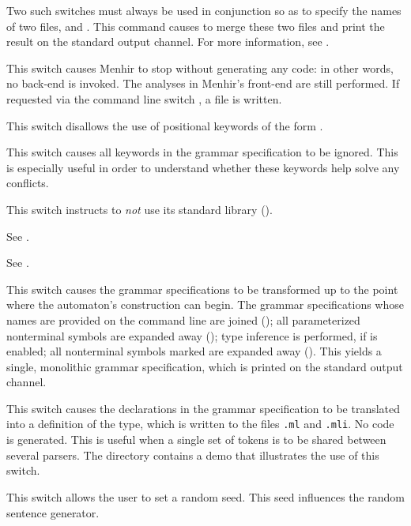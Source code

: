 \documentclass[onecolumn,11pt,nocopyrightspace,preprint]{sigplanconf}
\begin{document}
 Two such
switches must always be used in conjunction so as to specify the names of two
\messages files,  and . This command causes
\menhir to merge these two \messages files and print the result on the
standard output channel. For more information, see .

\docswitch{\onocodegeneration} This switch causes Menhir to stop without
generating any code: in other words, no back-end is invoked. The analyses in
Menhir's front-end are still performed. If requested via the command line
switch \ocmly, a \cmly file is written.

\docswitch{\onodollars} This switch disallows the use of positional keywords
of the form .

\docswitch{\onoinline} This switch causes all \dinline keywords in the
grammar specification to be ignored. This is especially useful in order
to understand whether these keywords help solve any conflicts.

\docswitch{\onostdlib} This switch instructs \menhir to \emph{not} use
its standard library ().

 See .

 See .

\docswitch{\oonlypreprocess} This switch causes the grammar specifications
to be transformed up to the point where the automaton's construction can
begin. The grammar specifications whose names are provided on the command line
are joined (); all parameterized nonterminal symbols are
expanded away (); type inference is performed, if \oinfer
is enabled; all nonterminal symbols marked \dinline are expanded away
(). This yields a single, monolithic grammar specification,
which is printed on the standard output channel.

\docswitch{\oonlytokens} This switch causes the \dtoken declarations in
the grammar specification to be translated into a definition of the \token
type, which is written to the files \texttt{.ml} and
\texttt{.mli}. No code is generated. This is useful when
a single set of tokens is to be shared between several parsers. The directory
 contains a demo that illustrates the use of this switch.

 This switch allows the user to set
a random seed. This seed influences the random sentence generator.
\end{document}
